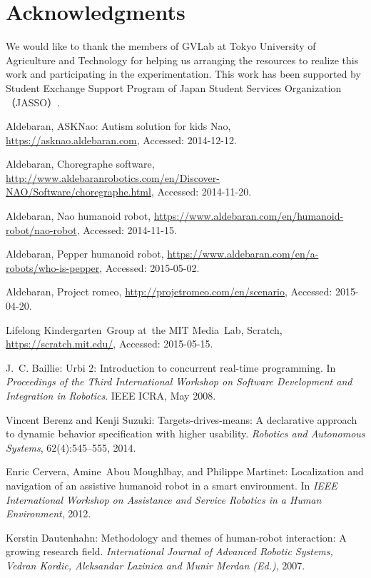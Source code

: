 \documentclass{llncs}
\begin{document}
\section{Acknowledgments}
		We would like to thank the members of GVLab at Tokyo University of Agriculture and Technology for helping us arranging the resources to realize this work and participating in the experimentation. This work has been supported by Student Exchange Support Program of Japan Student Services Organization （JASSO）.
%
%
\begin{thebibliography}{4}
Aldebaran, ASKNao: Autism solution for kids Nao, \url{https://asknao.aldebaran.com}, Accessed: 2014-12-12.

Aldebaran, Choregraphe software, \url{http://www.aldebaranrobotics.com/en/Discover-NAO/Software/choregraphe.html}, Accessed: 2014-11-20.

Aldebaran, Nao humanoid robot, \url{https://www.aldebaran.com/en/humanoid-robot/nao-robot}, Accessed: 2014-11-15.

Aldebaran, Pepper humanoid robot, \url{https://www.aldebaran.com/en/a-robots/who-is-pepper}, Accessed: 2015-05-02.

Aldebaran, Project romeo, \url{http://projetromeo.com/en/scenario}, Accessed: 2015-04-20.

Lifelong Kindergarten~Group at~the MIT Media~Lab, Scratch, \url{https://scratch.mit.edu/}, Accessed: 2015-05-15.

J.~C. Baillie: Urbi 2: Introduction to concurrent real-time programming. In {\em Proceedings of the Third International Workshop on Software Development and Integration in Robotics}. IEEE ICRA, May 2008.

Vincent Berenz and Kenji Suzuki: Targets-drives-means: {A} declarative approach to dynamic behavior specification with higher usability. {\em Robotics and Autonomous Systems}, 62(4):545--555, 2014.

Enric Cervera, Amine~Abou Moughlbay, and Philippe Martinet: Localization and navigation of an assistive humanoid robot in a smart environment. In {\em IEEE International Workshop on Assistance and Service Robotics in a Human Environment}, 2012.

Kerstin Dautenhahn: Methodology and themes of human-robot interaction: A growing research field. {\em International Journal of Advanced Robotic Systems, Vedran Kordic, Aleksandar Lazinica and Munir Merdan (Ed.)}, 2007.


\end{thebibliography}
\end{document}
